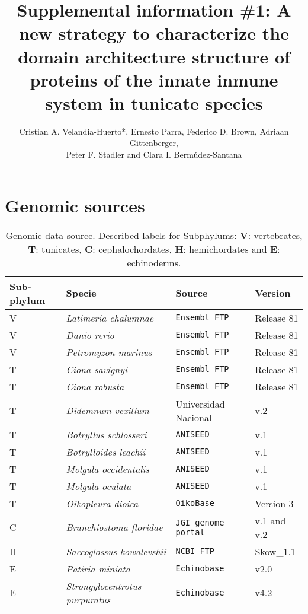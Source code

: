 \documentclass[12pt]{article}
\title{Supplemental information \#1: A new strategy to characterize the domain 
architecture structure of proteins of the innate inmune system in tunicate 
species}
\author{Cristian A. Velandia-Huerto*, Ernesto Parra, Federico D. 
Brown, Adriaan Gittenberger, \\ Peter F. Stadler and Clara I. 
Berm\'{u}dez-Santana}
\begin{document}
\maketitle

\section*{Genomic sources}
\begin{table}[ht!]
\centering
\begin{tabular}{p{2cm}p{5.6cm}p{5.5cm}l}
\toprule
\textbf{Sub-phylum} & \textbf{Specie} & \textbf{Source} & \textbf{Version} \\ 
\midrule
V & \textit{Latimeria chalumnae} & \texttt{Ensembl FTP}\footnotemark[1] & 
Release 81 \\
V & \textit{Danio rerio} & \texttt{Ensembl FTP}\footnotemark[2] & Release 81 \\
V & \textit{Petromyzon marinus} & \texttt{Ensembl FTP}\footnotemark[3] & 
Release 81 \\
\midrule
T & \textit{Ciona savignyi} & \texttt{Ensembl FTP}\footnotemark[4] & Release 81 
\\
T & \textit{Ciona robusta} & \texttt{Ensembl FTP}\footnotemark[5] & Release 81 
\\
T & \textit{Didemnum vexillum} & Universidad Nacional\footnotemark[8] & v.2 \\
T & \textit{Botryllus schlosseri} & \texttt{ANISEED}\footnotemark[9] & v.1 \\
T & \textit{Botrylloides leachii} & \texttt{ANISEED}\footnotemark[10] & v.1 \\
T &\textsl{Molgula occidentalis} & \texttt{ANISEED}\footnotemark[11] & v.1 \\
T &\textsl{Molgula oculata} & \texttt{ANISEED}\footnotemark[12] & v.1 \\
T & \textit{Oikopleura dioica} & \texttt{OikoBase}\footnotemark[13] & Version 3 \\
\midrule
C & \textit{Branchiostoma floridae} & \texttt{JGI genome 
portal}\footnotemark[14] & v.1 and v.2 \\
\midrule
H & \textit{Saccoglossus kowalevshii} & \texttt{NCBI FTP}\footnotemark[15] & 
Skow\_1.1 \\
E & \textit{Patiria miniata} & \texttt{Echinobase}\footnotemark[16] & v2.0 \\
E & \textit{Strongylocentrotus purpuratus} & 
\texttt{Echinobase}\footnotemark[17] & v4.2 \\
\bottomrule
\end{tabular}
\caption{Genomic data source. Described labels for Subphylums: \textbf{V}: 
vertebrates,  \textbf{T}: tunicates, \textbf{C}: cephalochordates, \textbf{H}: 
hemichordates and \textbf{E}: echinoderms.}\label{table:source}
\end{table}
\end{document}
